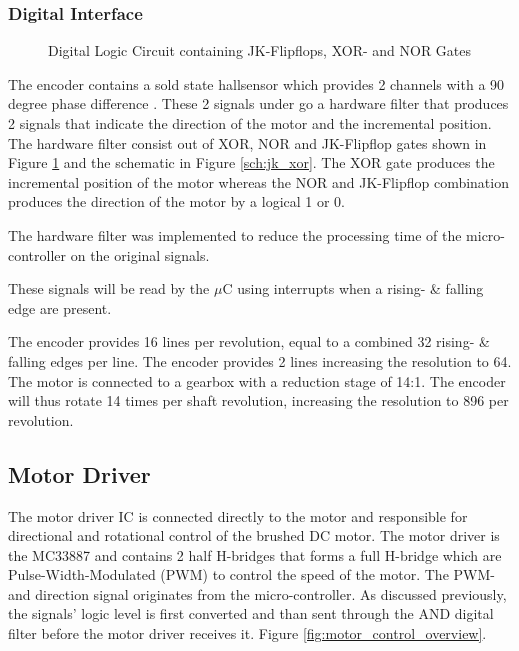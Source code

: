 \subsubsection{Digital Interface} 

\begin{figure}[h]
	\centering
	
	\caption{Digital Logic Circuit containing JK-Flipflops, XOR- and NOR Gates}
	\label{fig:jk_xor}
\end{figure}

The encoder contains a sold state hallsensor which provides 2 channels with a 90 degree phase difference \citep{faulhaberencoder}. These 2 signals under go a hardware filter that produces 2 signals that indicate the direction of the motor and the incremental position.\\

The hardware filter consist out of XOR, NOR and JK-Flipflop gates shown in Figure \ref{fig:jk_xor} and the schematic in Figure \ref{sch:jk_xor}. The XOR gate produces the incremental position of the motor whereas the NOR and JK-Flipflop combination produces the direction of the motor by a logical 1 or 0.



The hardware filter was implemented to reduce the processing time of the micro-controller on the original signals.







These signals will be read by the $\mu$C using interrupts when a rising- \& falling edge are present.

The encoder provides 16 lines per revolution, equal to a combined 32 rising- \& falling edges per line. The encoder provides 2 lines increasing the resolution to 64. The motor is connected to a gearbox with a reduction stage of 14:1. The encoder will thus rotate 14 times per shaft revolution, increasing the resolution to 896 per revolution.

\subsection{Motor Driver}

The motor driver IC is connected directly to the motor and responsible for directional and rotational control of the brushed DC motor. The motor driver is the MC33887 and contains 2 half H-bridges that forms a full H-bridge which are Pulse-Width-Modulated (PWM) to control the speed of the motor. The PWM- and direction signal originates from the micro-controller. As discussed previously, the signals' logic level is first converted and than sent through the AND digital filter before the motor driver receives it. Figure \ref{fig:motor_control_overview}.

